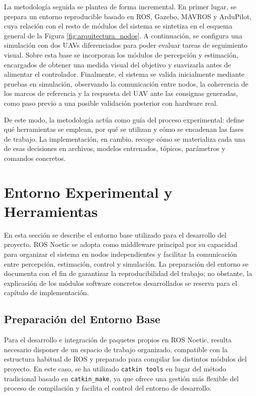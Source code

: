 \vspace{0.3cm}

La metodología seguida se plantea de forma incremental. En primer lugar, se prepara un entorno reproducible basado en ROS, Gazebo, MAVROS y ArduPilot, cuya relación con el resto de módulos del sistema se sintetiza en el esquema general de la Figura \ref{fig:arquitectura_nodos}. A continuación, se configura una simulación con dos UAVs diferenciados para poder evaluar tareas de seguimiento visual. Sobre esta base se incorporan los módulos de percepción y estimación, encargados de obtener una medida visual del objetivo y suavizarla antes de alimentar el controlador. Finalmente, el sistema se valida inicialmente mediante pruebas en simulación, observando la comunicación entre nodos, la coherencia de los marcos de referencia y la respuesta del UAV ante las consignas generadas, como paso previo a una posible validación posterior con hardware real.

\vspace{0.3cm}

De este modo, la metodología actúa como guía del proceso experimental: define qué herramientas se emplean, por qué se utilizan y cómo se encadenan las fases de trabajo. La implementación, en cambio, recoge cómo se materializa cada una de esas decisiones en archivos, modelos entrenados, tópicos, parámetros y comandos concretos.


\section{Entorno Experimental y Herramientas}
En esta sección se describe el entorno base utilizado para el desarrollo del proyecto. ROS Noetic \cite{Rosnoetic} se adopta como middleware principal por su capacidad para organizar el sistema en nodos independientes y facilitar la comunicación entre percepción, estimación, control y simulación. La preparación del entorno se documenta con el fin de garantizar la reproducibilidad del trabajo; no obstante, la explicación de los módulos software concretos desarrollados se reserva para el capítulo de implementación.

\subsection{Preparación del Entorno Base}
Para el desarrollo e integración de paquetes propios en ROS Noetic, resulta necesario disponer de un espacio de trabajo organizado, compatible con la estructura habitual de ROS y preparado para compilar los distintos módulos del proyecto. En este caso, se ha utilizado \texttt{catkin tools} en lugar del método tradicional basado en \texttt{catkin\_make}, ya que ofrece una gestión más flexible del proceso de compilación y facilita el control del entorno de desarrollo.

